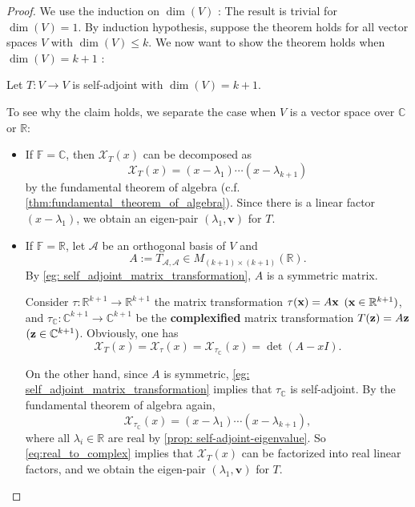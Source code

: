 \begin{proof}
We use the induction on \(\dim \left( V\right)\) : The result is trivial for \(\dim \left( V\right)  = 1\). By induction hypothesis, suppose the theorem holds for all vector spaces \(V\) with \(\dim \left( V\right)  \leq  k\). We now want to show the theorem holds when \(\dim \left( V\right)  = k + 1\) :

Let \(T : V \rightarrow  V\) is self-adjoint with \(\dim \left( V\right)  = k + 1\). 

\begin{center}
\end{center}
To see why the claim holds, we separate the case when $V$ is a vector space over $\mathbb{C}$ or $\mathbb{R}$:
\begin{itemize}
\item If \(\mathbb{F} = \mathbb{C}\), then \({\mathcal{X}}_{T}\left( x\right)\) can be decomposed as
\[
{\mathcal{X}}_{T}\left( x\right)  = \left( {x - {\lambda }_{1}}\right) \cdots \left( {x - {\lambda }_{k + 1}}\right)
\]
by the fundamental theorem of algebra (c.f. \autoref{thm:fundamental_theorem_of_algebra}). Since there is a linear factor $\left( {x - {\lambda }_{1}}\right)$, we obtain an eigen-pair \(\left( {{\lambda }_{1},\mathbf{v}}\right)\) for $T$.

\item If \(\mathbb{F} = \mathbb{R}\), let $\mathcal{A}$ be an orthogonal basis of $V$ and
$$A := T_{\mathcal{A},\mathcal{A}} \in M_{(k+1) \times (k+1)}(\mathbb{R}).$$
By \autoref{eg: self_adjoint_matrix_transformation}, $A$ is a symmetric matrix.

\smallskip
Consider $\tau: \mathbb{R}^{k+1} \to \mathbb{R}^{k+1}$ the matrix transformation $\tau({\bf x}) = A{\bf x}$ $({\bf x} \in \mathbb{R}^{k+1})$, and 
$\tau_{\mathbb{C}}: \mathbb{C}^{k+1} \to \mathbb{C}^{k+1}$ be the {\bf complexified} matrix transformation $T({\bf z}) = A{\bf z}$ $({\bf z} \in \mathbb{C}^{k+1})$. Obviously, one has
\begin{equation} \label{eq:real_to_complex}
\mathcal{X}_T(x) = \mathcal{X}_{\tau}(x) = \mathcal{X}_{\tau_{\mathbb{C}}}(x) = \det(A - xI).
\end{equation}

On the other hand, since $A$ is symmetric, \autoref{eg: self_adjoint_matrix_transformation} implies that $\tau_{\mathbb{C}}$ is self-adjoint. By the fundamental theorem of algebra again, 
\[
{\mathcal{X}}_{\tau_{\mathbb{C}}}\left( x\right)  = \left( {x - {\lambda }_{1}}\right) \cdots \left( {x - {\lambda }_{k + 1}}\right),
\]
where all \({\lambda }_{i}\in \mathbb{R}\) are real by \autoref{prop: self-adjoint-eigenvalue}. So \autoref{eq:real_to_complex} implies that $\mathcal{X}_T(x)$ can be factorized into real linear factors, and we obtain the eigen-pair \(\left( {{\lambda }_{1},\mathbf{v}}\right)\) for $T$.
\end{itemize}


\end{proof}
